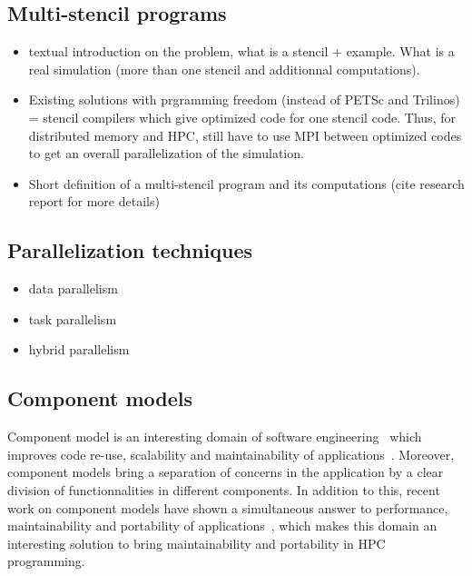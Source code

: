 \subsection{Multi-stencil programs}
\label{sect:multistencil}
\begin{itemize}
\item textual introduction on the problem, what is a stencil + example. What is a real simulation (more than one stencil and additionnal computations). 
\item Existing solutions with prgramming freedom (instead of PETSc and Trilinos) = stencil compilers which give optimized code for one stencil code. Thus, for distributed memory and HPC, still have to use MPI between optimized codes to get an overall parallelization of the simulation.
\item Short definition of a multi-stencil program and its computations (cite research report for more details)
\end{itemize}

\subsection{Parallelization techniques}
\label{sect:parallel}
\begin{itemize}
\item data parallelism
\item task parallelism
\item hybrid parallelism
\end{itemize}

\subsection{Component models}
Component model is an interesting domain of software engineering~\cite{Szyperski:2002:CSB:515228} which improves code re-use, scalability and maintainability of applications~\cite{Szyperski:2002:CSB:515228,bigot:inria-00388508}. Moreover, component models bring a separation of concerns in the application by a clear division of functionnalities in different components. In addition to this, recent work on component models have shown a simultaneous answer to performance, maintainability and portability of applications~\cite{l2c}, which makes this domain an interesting solution to bring maintainability and portability in HPC programming.

